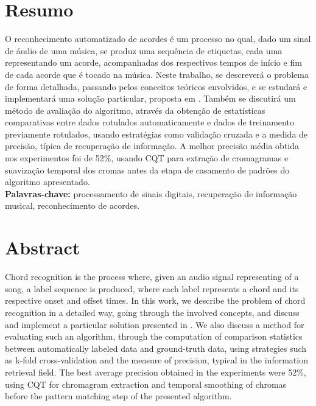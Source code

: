 \documentclass[12pt,twoside,a4paper]{book}
\begin{document}

\chapter*{Resumo}
O reconhecimento automatizado de acordes é um processo no qual, dado um sinal de áudio de uma música, se produz uma sequência de etiquetas, cada uma representando um acorde, acompanhadas dos respectivos tempos de início e fim de cada acorde que é tocado na música. Neste trabalho, se descreverá o problema de forma detalhada, passando pelos conceitos teóricos envolvidos, e se estudará e implementará uma solução particular, proposta em \cite{muller}. Também se discutirá um método de avaliação do algoritmo, através da obtenção de estatísticas comparativas entre dados rotulados automaticamente e dados de treinamento previamente rotulados, usando estratégias como validação cruzada e a medida de precisão, típica de recuperação de informação. A melhor precisão média obtida nos experimentos foi de 52\%, usando CQT para extração de cromagramas e suavização temporal dos cromas antes da etapa de casamento de padrões do algoritmo apresentado. \\

\noindent \textbf{Palavras-chave:} processamento de sinais digitais, recuperação de informação musical, reconhecimento de acordes.

\chapter*{Abstract}
Chord recognition is the process where, given an audio signal representing of a song, a label sequence is produced, where each label represents a chord and its respective onset and offset times. In this work, we describe the problem of chord recognition in a detailed way, going through the involved concepts, and discuss and implement a particular solution presented in \cite{muller}. We also discuss a method for evaluating such an algorithm, through the computation of comparison statistics between automatically labeled data and ground-truth data, using strategies such as k-fold cross-validation and the measure of precision, typical in the information retrieval field. The best average precision obtained in the experiments were 52\%, using CQT for chromagram extraction and temporal smoothing of chromas before the pattern matching step of the presented algorithm. \\
\end{document}
